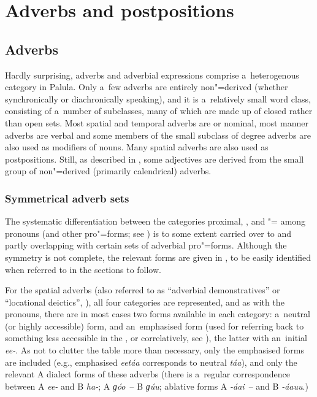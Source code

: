 \chapter{Adverbs and postpositions}
\label{chap:7}

\section{Adverbs}
\label{sec:7-1}


Hardly surprising, adverbs and adverbial expressions comprise a~heterogenous category in Palula. Only a~few adverbs are entirely non"=derived (whether synchronically or diachronically speaking), and it is a~relatively small word class, consisting of a~number of subclasses, many of which are made up of closed rather than open sets. Most spatial and temporal adverbs are  or nominal, most manner adverbs are verbal and some members of the small subclass of degree adverbs are also used as modifiers of nouns. Many spatial adverbs are also used as postpositions. Still, as described in , some adjectives are derived from the small group of non"=derived (primarily calendrical) adverbs.


\subsection{Symmetrical {adverb} sets}
\label{subsec:7-1-1}

The systematic differentiation between the categories proximal, ,  and "= among pronouns (and other pro"=forms; see ) is to some extent carried over to and partly overlapping with certain sets of adverbial pro"=forms. Although the symmetry is not complete, the relevant forms are given in , to be easily identified when referred to in the sections to follow.



For the spatial adverbs (also referred to as ``adverbial demonstratives'' or ``locational deictics'', \citealt[431]{diessel2006}), all four categories are represented, and as with the pronouns, there are in most cases two forms available in each category: a~neutral (or highly accessible) form, and an~emphasised form (used for referring back to something less accessible in the , or correlatively, see ), the latter with an~initial \textit{ee-}. As not to clutter the table more than necessary, only the emphasised forms are included (e.g., emphasised \textit{eetáa} corresponds to neutral \textit{táa}), and only the relevant A dialect forms of these adverbs (there is a~regular correspondence between A \textit{ee-} and B \textit{ha-}; A \textit{ɡóo}~-- B \textit{ɡúu}; ablative forms A \textit{-áai}~-- and B \textit{-áauu}.)



